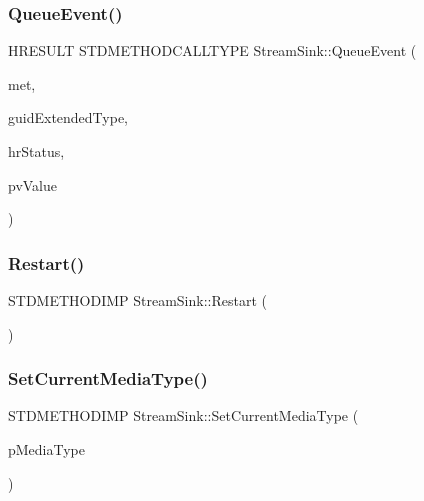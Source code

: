 \subsubsection{\texorpdfstring{Queue\+Event()}{QueueEvent()}}
{\footnotesize\ttfamily H\+R\+E\+S\+U\+LT S\+T\+D\+M\+E\+T\+H\+O\+D\+C\+A\+L\+L\+T\+Y\+PE Stream\+Sink\+::\+Queue\+Event (\begin{DoxyParamCaption}\item[{Media\+Event\+Type}]{met,  }\item[{R\+E\+F\+G\+U\+ID}]{guid\+Extended\+Type,  }\item[{H\+R\+E\+S\+U\+LT}]{hr\+Status,  }\item[{const P\+R\+O\+P\+V\+A\+R\+I\+A\+NT $\ast$}]{pv\+Value }\end{DoxyParamCaption})\hspace{0.3cm}{\ttfamily [inline]}}

\mbox{\label{class_stream_sink_a602a01d69f1af62b5b373a4c3d68b36f}} 
\subsubsection{\texorpdfstring{Restart()}{Restart()}}
{\footnotesize\ttfamily S\+T\+D\+M\+E\+T\+H\+O\+D\+I\+MP Stream\+Sink\+::\+Restart (\begin{DoxyParamCaption}{ }\end{DoxyParamCaption})\hspace{0.3cm}{\ttfamily [inline]}}

\mbox{\label{class_stream_sink_a4d2b574d314e8091a3f071a895ef8fbd}} 
\subsubsection{\texorpdfstring{Set\+Current\+Media\+Type()}{SetCurrentMediaType()}}
{\footnotesize\ttfamily S\+T\+D\+M\+E\+T\+H\+O\+D\+I\+MP Stream\+Sink\+::\+Set\+Current\+Media\+Type (\begin{DoxyParamCaption}\item[{I\+M\+F\+Media\+Type $\ast$}]{p\+Media\+Type }\end{DoxyParamCaption})\hspace{0.3cm}{\ttfamily [inline]}}

